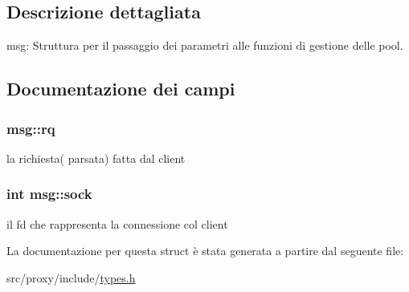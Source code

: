 \subsection{Descrizione dettagliata}
msg: Struttura per il passaggio dei parametri alle funzioni di gestione delle pool. 

\subsection{Documentazione dei campi}
\hypertarget{structmsg_a352d360ff9728d5158f3124f989c1652}{
\subsubsection[{rq}]{ {\bf msg::rq}}}
\label{structmsg_a352d360ff9728d5158f3124f989c1652}
la richiesta( parsata) fatta dal client \hypertarget{structmsg_a6c8d25eefec0d18f66eabc7bf9fc272f}{
\subsubsection[{sock}]{\setlength{\rightskip}{0pt plus 5cm}int {\bf msg::sock}}}
\label{structmsg_a6c8d25eefec0d18f66eabc7bf9fc272f}
il fd che rappresenta la connessione col client 

La documentazione per questa struct è stata generata a partire dal seguente file:\begin{DoxyCompactItemize}
\item 
src/proxy/include/\hyperlink{types_8h}{types.h}\end{DoxyCompactItemize}
